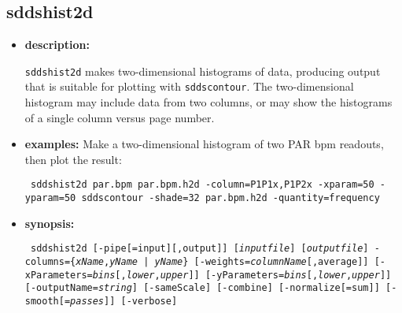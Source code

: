 \begin{latexonly}
\newpage
\end{latexonly}

\subsection{sddshist2d}
\label{sddshist2d}

\begin{itemize}
\item {\bf description:}

{\tt sddshist2d} makes two-dimensional histograms of data, producing
output that is suitable for plotting with {\tt sddscontour}.
The two-dimensional histogram may include data from two columns, or may
show the histograms of a single column versus page number.

\item {\bf examples:} 
Make a two-dimensional histogram of two PAR bpm readouts, then plot the result:
\begin{flushleft}{\tt 
sddshist2d par.bpm par.bpm.h2d -column=P1P1x,P1P2x -xparam=50 -yparam=50
sddscontour -shade=32 par.bpm.h2d -quantity=frequency
}
\end{flushleft}

\item {\bf synopsis:} 
\begin{flushleft}{\tt
sddshist2d [-pipe[=input][,output]] [{\em inputfile}] [{\em outputfile}]
-columns=\{{\em xName},{\em yName} | {\em yName}\}
[-weights={\em columnName}[,average]]
[-xParameters={\em bins}[,{\em lower},{\em upper}]] [-yParameters={\em bins}[,{\em lower},{\em upper}]]
[-outputName={\em string}] 
[-sameScale] [-combine] [-normalize[=sum]] [-smooth[={\em passes}]] 
[-verbose] 
}\end{flushleft}


\end{itemize}
